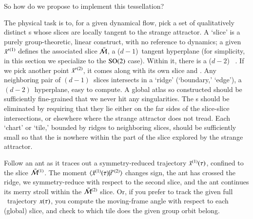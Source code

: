 \documentclass[preprint,12pt]{elsarticle} %
\begin{document}
So how do we propose to implement this tessellation?

The physical task is to, for a given dynamical flow, pick a set of
qualitatively distinct {\template s} whose slices are locally tangent to
the strange attractor. A `slice' is a purely group-theoretic, linear
construct, with no reference to dynamics; a given {\template}
$\bar{x}'{}^{(1)}$ defines the associated slice $\bar{\cal M}$, a
($d\!-\!1$)\dmn\ tangent hyperplane (for simplicity, in this section we
specialize to the $\textrm{SO}(2)$ case). Within it, there is a ($d\!-\!2$)\dmn\
{\sset} . If we pick another {\template} point
$\bar{x}'{}^{(2)}$, it comes along with its own slice and {\sset}. Any
neighboring pair of $(d\!-\!1)$\dmn\ slices intersects in a `ridge'
(`boundary,' `edge'), a $(d\!-\!2)$\dmn\ hyperplane, easy to compute.
A global atlas so constructed should be sufficiently
fine-grained that we never hit any {\sset} singularities. The {\sset}s
should be eliminated by requiring that they lie either on the far sides
of the slice-slice intersections, or elsewhere where the strange
attractor does not tread. Each `chart' or `tile,' bounded by ridges to
neighboring slices, should be sufficiently small so that the {\sset} is
nowhere within the part of the slice explored by the strange attractor.

Follow an ant as it traces out a symmetry-reduced trajectory
$\bar{x}{}^{(1)}(\tau)$, confined to the slice $\bar{\cal M}{}^{(1)}$. The
moment $\braket{\sspRed{}^{(1)}(\tau)}{\sliceTan{}{}^{(2)}}$ changes
sign, the ant has crossed the ridge, we symmetry-reduce with respect to
the second slice, and the ant continues its merry stroll within the
$\bar{\cal M}{}^{(2)}$ slice. Or, if you prefer to track the  given full
\statesp\ trajectory $x(\tau)$, you compute the moving-frame angle
with respect to each (global) slice, and check to which tile does the
given group orbit belong.
\end{document}
